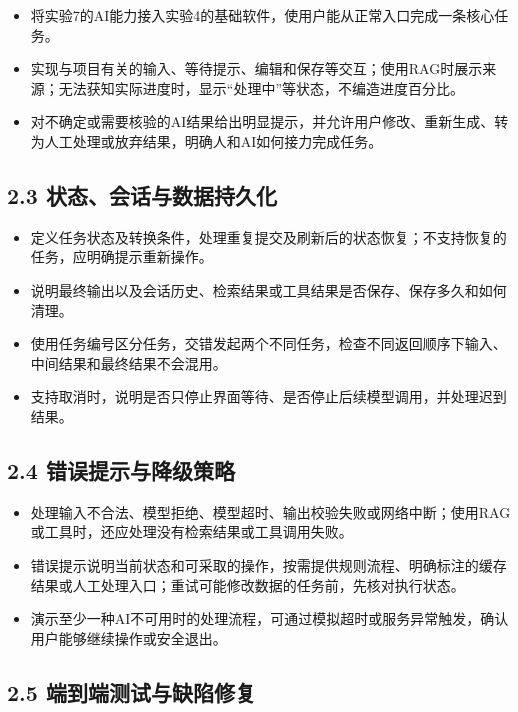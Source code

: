 \documentclass[UTF8,12pt,a4paper]{ctexart}
\begin{document}
\begin{itemize}
  \item 将实验7的AI能力接入实验4的基础软件，使用户能从正常入口完成一条核心任务。
  \item 实现与项目有关的输入、等待提示、编辑和保存等交互；使用RAG时展示来源；无法获知实际进度时，显示“处理中”等状态，不编造进度百分比。
  \item 对不确定或需要核验的AI结果给出明显提示，并允许用户修改、重新生成、转为人工处理或放弃结果，明确人和AI如何接力完成任务。
\end{itemize}

\subsection*{2.3 状态、会话与数据持久化}

\begin{itemize}
  \item 定义任务状态及转换条件，处理重复提交及刷新后的状态恢复；不支持恢复的任务，应明确提示重新操作。
  \item 说明最终输出以及会话历史、检索结果或工具结果是否保存、保存多久和如何清理。
  \item 使用任务编号区分任务，交错发起两个不同任务，检查不同返回顺序下输入、中间结果和最终结果不会混用。
  \item 支持取消时，说明是否只停止界面等待、是否停止后续模型调用，并处理迟到结果。
\end{itemize}

\subsection*{2.4 错误提示与降级策略}

\begin{itemize}
  \item 处理输入不合法、模型拒绝、模型超时、输出校验失败或网络中断；使用RAG或工具时，还应处理没有检索结果或工具调用失败。
  \item 错误提示说明当前状态和可采取的操作，按需提供规则流程、明确标注的缓存结果或人工处理入口；重试可能修改数据的任务前，先核对执行状态。
  \item 演示至少一种AI不可用时的处理流程，可通过模拟超时或服务异常触发，确认用户能够继续操作或安全退出。
\end{itemize}

\subsection*{2.5 端到端测试与缺陷修复}
\end{document}
